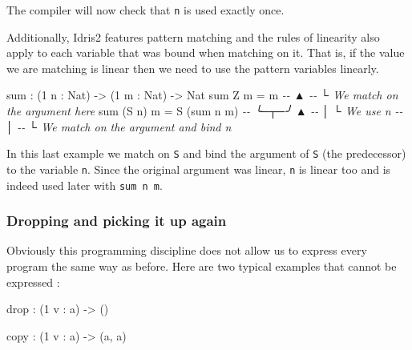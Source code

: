 \documentclass[
]{article}
\newenvironment{Shaded}{}{}
\newcommand{\CommentTok}[1]{\textcolor[rgb]{0.38,0.63,0.69}{\textit{#1}}}
\newcommand{\DataTypeTok}[1]{\textcolor[rgb]{0.56,0.13,0.00}{#1}}
\newcommand{\DecValTok}[1]{\textcolor[rgb]{0.25,0.63,0.44}{#1}}
\newcommand{\FunctionTok}[1]{\textcolor[rgb]{0.02,0.16,0.49}{#1}}
\newcommand{\NormalTok}[1]{#1}
\newcommand{\OperatorTok}[1]{\textcolor[rgb]{0.40,0.40,0.40}{#1}}
\newcommand{\OtherTok}[1]{\textcolor[rgb]{0.00,0.44,0.13}{#1}}
\begin{document}
The compiler will now check that \texttt{n} is used exactly once.

Additionally, Idris2 features pattern matching and the rules of
linearity also apply to each variable that was bound when matching on
it. That is, if the value we are matching is linear then we need to use
the pattern variables linearly.

\begin{Shaded}
\begin{Highlighting}[]
\FunctionTok{sum} \OperatorTok{:}\NormalTok{ (}\DecValTok{1}\NormalTok{ n }\OperatorTok{:} \DataTypeTok{Nat}\NormalTok{) }\OtherTok{{-}\textgreater{}}\NormalTok{ (}\DecValTok{1}\NormalTok{ m }\OperatorTok{:} \DataTypeTok{Nat}\NormalTok{) }\OtherTok{{-}\textgreater{}} \DataTypeTok{Nat}
\FunctionTok{sum} \DataTypeTok{Z}\NormalTok{ m }\OtherTok{=}\NormalTok{ m}
\CommentTok{{-}{-}  ▲}
\CommentTok{{-}{-}  └ We match on the argument here}
\FunctionTok{sum}\NormalTok{ (}\DataTypeTok{S}\NormalTok{ n) m }\OtherTok{=} \DataTypeTok{S}\NormalTok{ (}\FunctionTok{sum}\NormalTok{ n m)}
\CommentTok{{-}{-}  ╰─┬─╯            ▲}
\CommentTok{{-}{-}    │              └ We use \textasciigrave{}n\textasciigrave{}}
\CommentTok{{-}{-}    │}
\CommentTok{{-}{-}    └ We match on the argument and bind \textasciigrave{}n\textasciigrave{}}
\end{Highlighting}
\end{Shaded}

In this last example we match on \texttt{S} and bind the argument of
\texttt{S} (the predecessor) to the variable \texttt{n}. Since the
original argument was linear, \texttt{n} is linear too and is indeed
used later with \texttt{sum\ n\ m}.

\hypertarget{dropping-and-picking-it-up-again}{%
\subsubsection{Dropping and picking it up
again}\label{dropping-and-picking-it-up-again}}

Obviously this programming discipline does not allow us to express every
program the same way as before. Here are two typical examples that
cannot be expressed :

\begin{Shaded}
\begin{Highlighting}[]
\FunctionTok{drop} \OperatorTok{:}\NormalTok{ (}\DecValTok{1}\NormalTok{ v }\OperatorTok{:}\NormalTok{ a) }\OtherTok{{-}\textgreater{}}\NormalTok{ ()}

\NormalTok{copy }\OperatorTok{:}\NormalTok{ (}\DecValTok{1}\NormalTok{ v }\OperatorTok{:}\NormalTok{ a) }\OtherTok{{-}\textgreater{}}\NormalTok{ (a, a)}
\end{Highlighting}
\end{Shaded}
\end{document}
